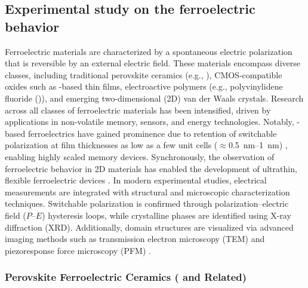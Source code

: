 \documentclass[a4paper,fleqn]{cas-sc}
\begin{document}
\subsection{Experimental study on the ferroelectric behavior} \label{laser_and_structure}
\par Ferroelectric materials are characterized by a spontaneous electric polarization that is reversible by an external electric field. These materials encompass diverse classes, including traditional perovskite ceramics (e.g., ), CMOS-compatible oxides such as -based thin films, electroactive polymers (e.g., polyvinylidene fluoride ()), and emerging two-dimensional (2D) van der Waals crystals. Research across all classes of ferroelectric materials has been intensified, driven by applications in non-volatile memory, sensors, and energy technologies. Notably, -based ferroelectrics have gained prominence due to retention of switchable polarization at film thicknesses as low as a few unit cells ($\approx$\SIrange{0.5}{1}{\nano\meter}) \cite{wang2025unlocking}, enabling highly scaled memory devices. Synchronously, the observation of ferroelectric behavior in 2D materials has enabled the development of ultrathin, flexible ferroelectric devices \cite{xu2021two}. In modern experimental studies, electrical measurements are integrated with structural and microscopic characterization techniques. Switchable polarization is confirmed through polarization--electric field ($P$--$E$) hysteresis loops, while crystalline phases are identified using X-ray diffraction (XRD). Additionally, domain structures are visualized via advanced imaging methods such as transmission electron microscopy (TEM) and piezoresponse force microscopy (PFM) \cite{wang2025unlocking}.

\subsubsection*{Perovskite Ferroelectric Ceramics ( and Related)}
\end{document}
